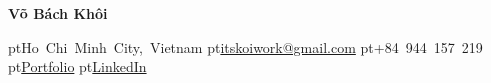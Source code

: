 \documentclass[10pt, a4paper]{article}
\renewcommand{\normalsize}{\fontsize{9.2 pt}{11 pt}\selectfont}
\newenvironment{header}{
    \setlength{\topsep}{0pt}\par\kern\topsep\centering
}{
    \par\kern\topsep
} %
\begin{document}
    \normalsize

    \begin{header}
        {\fontsize{20 pt}{24 pt}\selectfont \textbf{\color{primaryColor}Võ Bách Khôi}}

        \vspace{2 pt}

        {\color{primaryColor}\faMapMarker} pt\mbox{Ho Chi Minh City, Vietnam}\quad
        {\color{primaryColor}\faEnvelope} pt\mbox{\href{mailto:itskoiwork@gmail.com}{itskoiwork@gmail.com}}\quad
        {\color{primaryColor}\faPhone} pt\mbox{+84 944 157 219}\quad
        {\color{primaryColor}\faGlobe} pt\mbox{\href{https://itskoi.github.io/}{Portfolio}}\quad
        {\color{primaryColor}\faLinkedin} pt\mbox{\href{https://linkedin.com/in/bachkhoivo}{LinkedIn}}
    \end{header}

\end{document}
